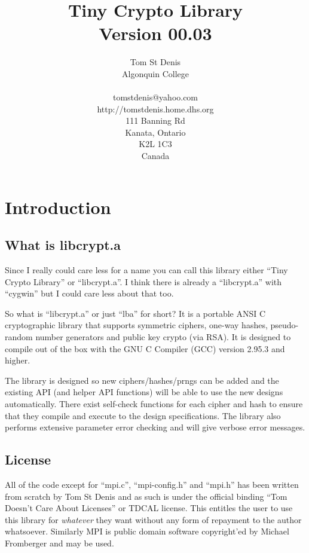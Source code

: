\documentclass{book}
\begin{document}
\title{Tiny Crypto Library \\ Version 00.03}
\author{Tom St Denis \\
Algonquin College \\
\\
tomstdenis@yahoo.com \\
http://tomstdenis.home.dhs.org \\
111 Banning Rd \\
Kanata, Ontario \\
K2L 1C3 \\
Canada 
}
\maketitle
\newpage
\tableofcontents
\chapter{Introduction}
\section{What is libcrypt.a}
Since I really could care less for a name you can call this library either ``Tiny Crypto Library'' or ``libcrypt.a''.  I
think there is already a ``libcrypt.a'' with ``cygwin'' but I could care less about that too.

So what is ``libcrypt.a'' or just ``lba'' for short?  It is a portable ANSI C cryptographic library that supports
symmetric ciphers, one-way hashes, pseudo-random number generators and public key crypto (via RSA).  It is designed 
to compile out of the box with the GNU C Compiler (GCC) version 2.95.3 and higher.  

The library is designed so new ciphers/hashes/prngs can be added and the existing API (and helper API functions) will 
be able to use the new designs automatically.  There exist self-check functions for each cipher and hash to ensure that
they compile and execute to the design specifications.  The library also performs extensive parameter error checking
and will give verbose error messages.

\section{License}

All of the code except for ``mpi.c'', ``mpi-config.h'' and ``mpi.h'' has been written from scratch by Tom St Denis
and as such is under the official binding ``Tom Doesn't Care About Licenses'' or TDCAL license.  This entitles the 
user to use this library for {\em whatever} they want without any form of repayment to the author whatsoever.  Similarly
MPI is public domain software copyright'ed by Michael Fromberger and may be used.
\end{document}
